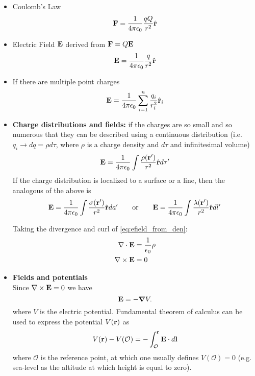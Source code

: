 \documentclass[11pt]{article}
\begin{document}
\begin{itemize}

\item Coulomb's Law
\begin{equation}
\mathbf{F} = \frac{1}{4 \pi \epsilon_0} \frac{q Q}{r^2} \hat{\mathbf{r}}
\end{equation}

\item Electric Field $\mathbf{E}$ derived from $\mathbf{F} = Q\mathbf{E}$
\begin{equation}
\mathbf{E} = \frac{1}{4 \pi \epsilon_0} \frac{q}{r^2} \hat{\mathbf{r}}
\end{equation}

\item If there are multiple point charges
\begin{equation}
\mathbf{E} = \frac{1}{4 \pi \epsilon_0} \sum_{i=1}^{n} \frac{q_i}{r_i^2} \hat{\mathbf{r}}_i
\end{equation}

\item \textbf{Charge distributions and fields:} if the charges are so small and so numerous that they can be described using a continuous distribution (i.e.\@ $q_i \to dq = \rho d\tau$, where $\rho$ is a charge density and $d\tau$ and infinitesimal volume)
\begin{equation}
\mathbf{E} = \frac{1}{4 \pi \epsilon_0} \int \frac{\rho(\mathbf{r}')}{r^2} \hat{\mathbf{r}} d\tau' \label{eq:efield_from_den}
\end{equation}
If the charge distribution is localized to a surface or a line, then the analogous of the above is
\begin{equation}
    \mathbf{E} = \frac{1}{4 \pi \epsilon_0} \int \frac{\sigma(\mathbf{r}')}{r^2} \hat{\mathbf{r}} da' \qquad \text{or} \qquad \mathbf{E} = \frac{1}{4 \pi \epsilon_0} \int \frac{\lambda(\mathbf{r}')}{r^2} \hat{\mathbf{r}} dl'
\end{equation}

Taking the divergence and curl of \cref{eq:efield_from_den}:
\begin{align}
\nabla \cdot \mathbf{E} &= \frac{1}{\epsilon_0} \rho \\
\nabla \times \mathbf{E} &= 0
\end{align}

\item \textbf{Fields and potentials}\\
Since $\nabla \times \mathbf{E} = 0$ we have 
\begin{equation}
\label{eq:efield_from_potential}
\mathbf{E} = -\bm \nabla V.
\end{equation}
where $V$ is the electric potential. Fundamental theorem of calculus can be used to express the potential $V(\mathbf{r})$ as
\begin{equation}
V(\mathbf{r}) - V(\mathcal{O}) = -\int_\mathcal{O}^{\mathbf{r}} \mathbf{E} \cdot d\mathbf{l}
\end{equation}
where $\mathcal{O}$ is the reference point, at which one usually defines $V(\mathcal{O}) = 0$ (e.g. sea-level as the altitude at which height is equal to zero). 


\end{itemize}
\end{document}
